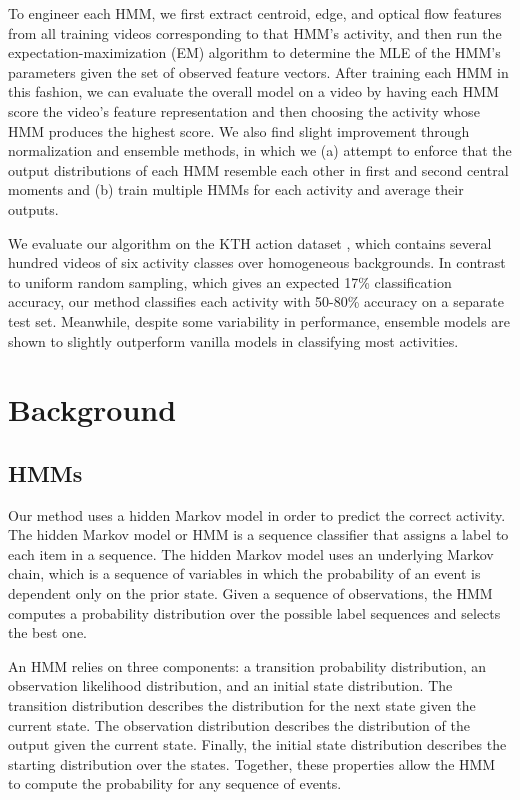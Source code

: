 \documentclass{article}
\begin{document}
To engineer each HMM, we first extract centroid, edge, and optical flow features from all training videos corresponding to that HMM's activity, and then run the expectation-maximization (EM) algorithm to determine the MLE of the HMM's parameters given the set of observed feature vectors. After training each HMM in this fashion, we can evaluate the overall model on a video by having each HMM score the video's feature representation and then choosing the activity whose HMM produces the highest score. We also find slight improvement through normalization and ensemble methods, in which we (a) attempt to enforce that the output distributions of each HMM resemble each other in first and second central moments and (b) train multiple HMMs for each activity and average their outputs.

We evaluate our algorithm on the KTH action dataset \cite{slc2004}, which contains several hundred videos of six activity classes over homogeneous backgrounds. In contrast to uniform random sampling, which gives an expected 17\% classification accuracy, our method classifies each activity with 50-80\% accuracy on a separate test set. Meanwhile, despite some variability in performance, ensemble models are shown to slightly outperform vanilla models in classifying most activities.

\section{Background}

\subsection{HMMs}\label{sec:hmms}

Our method uses a hidden Markov model in order to predict the correct activity. The hidden Markov model or HMM is a sequence classifier that assigns a label to each item in a sequence. The hidden Markov model uses an underlying Markov chain, which is a sequence of variables in which the probability of an event is dependent only on the prior state. Given a sequence of observations, the HMM computes a probability distribution over the possible label sequences and selects the best one. 

An HMM relies on three components: a transition probability distribution, an observation likelihood distribution, and an initial state distribution. The transition distribution describes the distribution for the next state given the current state. The observation distribution describes the distribution of the output given the current state. Finally, the initial state distribution describes the starting distribution over the states. Together, these properties allow the HMM to compute the probability for any sequence of events.
\end{document}
